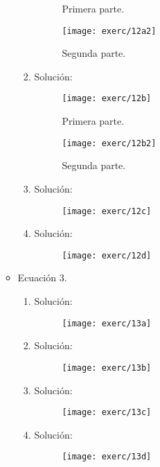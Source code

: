 \documentclass[fleqn]{article}
\begin{document}
\begin{enumerate}
\begin{itemize}
\begin{enumerate}[label=\alph*)]
\begin{figure}[H]
        \caption{Primera parte.}
      \end{figure}
      \begin{figure}[H]
        \centering
        \texttt{[image: exerc/12a2]}
        \caption{Segunda parte.}
      \end{figure}
    \item Solución:
      \begin{figure}[H]
        \centering
        \texttt{[image: exerc/12b]}
        \caption{Primera parte.}
      \end{figure}
      \begin{figure}[H]
        \centering
        \texttt{[image: exerc/12b2]}
        \caption{Segunda parte.}
      \end{figure}
    \item Solución:
      \begin{figure}[H]
        \centering
        \texttt{[image: exerc/12c]}
      \end{figure}
    \item Solución:
      \begin{figure}[H]
        \centering
        \texttt{[image: exerc/12d]}
      \end{figure}
    \end{enumerate}
  \item Ecuación 3.
    \begin{enumerate}[label=\alph*)]
    \item Solución:
      \begin{figure}[H]
        \centering
        \texttt{[image: exerc/13a]}
      \end{figure}
    \item Solución:
      \begin{figure}[H]
        \centering
        \texttt{[image: exerc/13b]}
      \end{figure}
    \item Solución:
      \begin{figure}[H]
        \centering
        \texttt{[image: exerc/13c]}
      \end{figure}
    \item Solución:
      \begin{figure}[H]
        \centering
        \texttt{[image: exerc/13d]}
      \end{figure}
    \end{enumerate}
  \end{itemize}


\end{enumerate}
\end{document}
